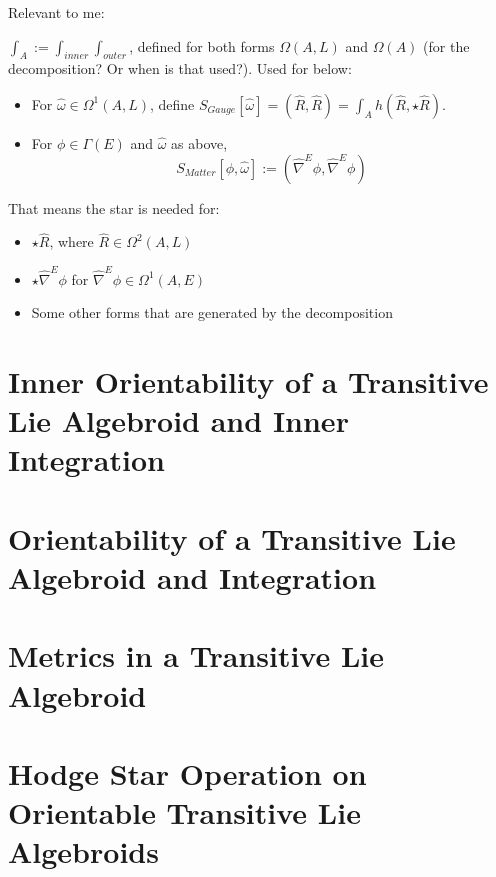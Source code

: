 Relevant to me:

$\int_A := \int_{inner} \int_{outer}$, defined for both forms $\Omega(A, L)$ and $\Omega(A)$ (for the decomposition? Or when is that used?). Used for below:

    \begin{itemize}
    
    \item For $\hat \omega \in \Omega^1(A, L)$, define $S_{Gauge}[\hat \omega] = (\hat R, \hat R) = \int_A h(\hat R, \star \hat R)$.
    
    \item For $\phi \in \Gamma(E)$ and $\hat \omega$ as above, \[S_{Matter}[\phi, \hat \omega] := (\hat \nabla^E \phi, \hat \nabla^E \phi)\]
    
    \end{itemize}
    
That means the star is needed for: 
    \begin{itemize}
        
    \item $\star \hat R$, where $\hat R \in \Omega^2(A, L)$
    
    \item $\star \hat \nabla^E \phi$ for $\hat \nabla^E \phi \in \Omega^1(A, E)$
    
    \item Some other forms that are generated by the decomposition
        
    \end{itemize}


\section{Inner Orientability of a Transitive Lie Algebroid and Inner Integration}

\section{Orientability of a Transitive Lie Algebroid and Integration}

\section{Metrics in a Transitive Lie Algebroid}

\section{Hodge Star Operation on Orientable Transitive Lie Algebroids}
